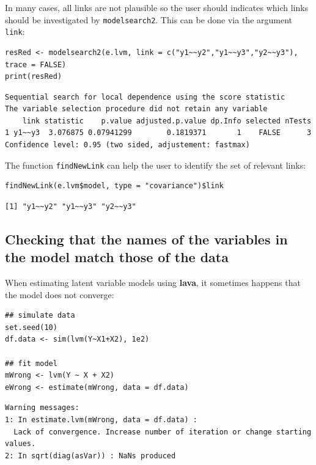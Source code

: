 \documentclass[12pt]{article}
\begin{document}
In many cases, all links are not plausible so the user should
indicates which links should be investigated by \texttt{modelsearch2}. This
can be done via the argument \texttt{link}:

\lstset{language=r,label= ,caption= ,captionpos=b,numbers=none}
\begin{lstlisting}
resRed <- modelsearch2(e.lvm, link = c("y1~~y2","y1~~y3","y2~~y3"), trace = FALSE)
print(resRed)
\end{lstlisting}

\begin{verbatim}
Sequential search for local dependence using the score statistic 
The variable selection procedure did not retain any variable 
    link statistic    p.value adjusted.p.value dp.Info selected nTests
1 y1~~y3  3.076875 0.07941299        0.1819371       1    FALSE      3
Confidence level: 0.95 (two sided, adjustement: fastmax)
\end{verbatim}


The function \texttt{findNewLink} can help the user to identify the set of
relevant links:
\lstset{language=r,label= ,caption= ,captionpos=b,numbers=none}
\begin{lstlisting}
findNewLink(e.lvm$model, type = "covariance")$link
\end{lstlisting}

\begin{verbatim}
[1] "y1~~y2" "y1~~y3" "y2~~y3"
\end{verbatim}

\subsection{Checking that the names of the variables in the model match those of the data}
\label{sec:orge2d4701}

When estimating latent variable models using \textbf{lava}, it sometimes
happens that the model does not converge:
\lstset{language=r,label= ,caption= ,captionpos=b,numbers=none}
\begin{lstlisting}
## simulate data
set.seed(10)
df.data <- sim(lvm(Y~X1+X2), 1e2)

## fit model
mWrong <- lvm(Y ~ X + X2)
eWrong <- estimate(mWrong, data = df.data)
\end{lstlisting}

\begin{verbatim}
Warning messages:
1: In estimate.lvm(mWrong, data = df.data) :
  Lack of convergence. Increase number of iteration or change starting values.
2: In sqrt(diag(asVar)) : NaNs produced
\end{verbatim}
\end{document}
